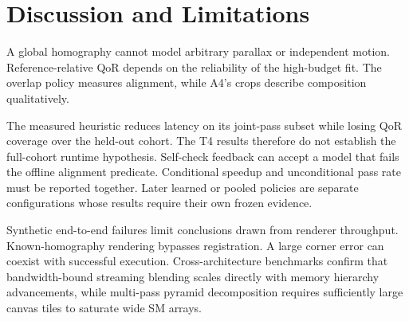 \section{Discussion and Limitations}
\label{sec:discussion}
A global homography cannot model arbitrary parallax or independent motion.
Reference-relative QoR depends on the reliability of the high-budget fit.
The overlap policy measures alignment, while A4's crops describe composition
qualitatively.

The measured heuristic reduces latency on its joint-pass subset while losing
QoR coverage over the held-out cohort. The T4 results therefore do not establish
the full-cohort runtime hypothesis. Self-check feedback can accept a model
that fails the offline alignment predicate. Conditional speedup and unconditional
pass rate must be reported together. Later learned or pooled policies are
separate configurations whose results require their own frozen evidence.

Synthetic end-to-end failures limit conclusions drawn from renderer throughput.
Known-homography rendering bypasses registration. A large corner error can
coexist with successful execution. Cross-architecture benchmarks confirm that
bandwidth-bound streaming blending scales directly with memory hierarchy
advancements, while multi-pass pyramid decomposition requires sufficiently large
canvas tiles to saturate wide SM arrays.
